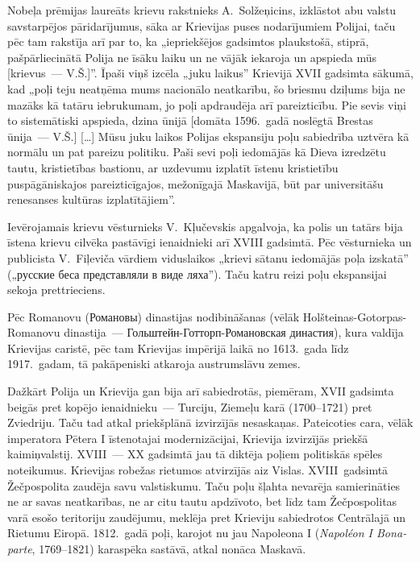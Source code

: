 \documentclass[twoside,a5paper,12pt,fleqn,openany]{extbook}
\newcommand{\rutxti}[1]{\textrussian{#1}}
\newcommand{\frtxti}[1]{\textit{\textfrench{#1}}}
\newcommand{\citespace}{[\dots{}]}
\begin{document}
Nobeļa prēmijas laureāts krievu rakstnieks A.~Solžeņicins, izklāstot abu valstu savstarpējos pāridarījumus, sāka ar Krievijas puses nodarījumiem Polijai, taču pēc tam rakstīja arī par to, ka „iepriekšējos gadsimtos plaukstošā, stiprā, pašpārliecinātā Polija ne īsāku laiku un ne vājāk iekaroja un apspieda mūs [krievus~--- V.Š.]”. Īpaši viņš izcēla „juku laikus” Krievijā XVII gadsimta sākumā, kad „poļi teju neatņēma mums nacionālo neatkarību, šo briesmu dziļums bija ne mazāks kā tatāru iebrukumam, jo poļi apdraudēja arī pareizticību. Pie sevis viņi to sistemātiski apspieda, dzina ūnijā [domāta 1596.~gadā noslēgtā Brestas ūnija~--- V.Š.] \citespace{} Mūsu juku laikos Polijas ekspansiju poļu sabiedrība uztvēra kā normālu un pat pareizu politiku. Paši sevi poļi iedomājās kā Dieva izredzētu tautu, kristietības bastionu, ar uzdevumu izplatīt īstenu kristietību puspāgāniskajos pareizticīgajos, mežonīgajā Maskavijā, būt par universitāšu renesanses kultūras izplatītājiem”.

Ievērojamais krievu vēsturnieks V.~Kļučevskis apgalvoja, ka polis un tatārs bija īstena krievu cilvēka pastāvīgi ienaidnieki arī XVIII gadsimtā. Pēc vēsturnieka un publicista V.~Fiļeviča vārdiem viduslaikos „krievi sātanu iedomājās poļa izskatā” („\rutxti{русские беса представляли в виде ляха}”). Taču katru reizi poļu ekspansijai sekoja prettrieciens.

Pēc Romanovu (\rutxti{Романовы}) dinastijas nodibināšanas (vēlāk Holšteinas-Gotorpas-Romanovu dinastija~--- \rutxti{Гольштейн-Готторп-Романовская династия}), kura valdīja Krievijas caristē, pēc tam Krievijas impērijā laikā no 1613.~gada līdz 1917.~gadam, tā pakāpeniski atkaroja austrumslāvu zemes.

Dažkārt Polija un Krievija gan bija arī sabiedrotās, piemēram, XVII gadsimta beigās pret kopējo ienaidnieku~--- Turciju, Ziemeļu karā (1700--1721) pret Zviedriju. Taču tad atkal priekšplānā izvirzījās nesaskaņas. Pateicoties cara, vēlāk imperatora Pētera I īstenotajai modernizācijai, Krievija izvirzījās priekšā kaimiņvalstij. XVIII~--- XX gadsimtā jau tā diktēja poļiem politiskās spēles noteikumus. Krievijas robežas rietumos atvirzījās aiz Vislas. XVIII~gadsimtā Žečpospolita zaudēja savu valstiskumu. Taču poļu šļahta nevarēja samierināties ne ar savas neatkarības, ne ar citu tautu apdzīvoto, bet līdz tam Žečpospolitas varā esošo teritoriju zaudējumu, meklēja pret Krieviju sabiedrotos Centrālajā un Rietumu Eiropā. 1812.~gadā poļi, karojot nu jau Napoleona I (\frtxti{Napoléon I Bonaparte}, 1769--1821) karaspēka sastāvā, atkal nonāca Maskavā.
\end{document}
